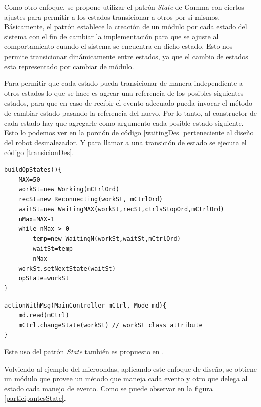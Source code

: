 Como otro enfoque, se propone utilizar el patrón \textit{State} de Gamma con ciertos ajustes para permitir a los estados transicionar a otros por si mismos. Básicamente, el patrón establece la creación de un módulo por cada estado del sistema con el fin de cambiar la implementación para que se ajuste al comportamiento cuando el sistema se encuentra en dicho estado. Esto nos permite transicionar dinámicamente entre estados, ya que el cambio de estados esta representado por cambiar de módulo.

Para permitir que cada estado pueda transicionar de manera independiente a otros estados lo que se hace es agrear una referencia de los posibles siguientes estados, para que en caso de recibir el evento adecuado pueda invocar el método de cambiar estado pasando la referencia del nuevo. Por lo tanto, al constructor de cada estado hay que agregarle como argumento cada posible estado siguiente. Esto lo podemos ver en la porción de código \ref{waitingDes} perteneciente al diseño del robot desmalezador. Y para llamar a una transición de estado se ejecuta el código \ref{transicionDes}.

\begin{lstlisting}[label={waitingDes},caption=Código ejemplo transición robot desmalezador,style=seudocode]
buildOpStates(){
    MAX=50
    workSt=new Working(mCtrlOrd)
    recSt=new Reconnecting(workSt, mCtrlOrd)
    waitSt=new WaitingMAX(workSt,recSt,ctrlsStopOrd,mCtrlOrd)
    nMax=MAX-1
    while nMax > 0
        temp=new WaitingN(workSt,waitSt,mCtrlOrd)
        waitSt=temp
        nMax--
    workSt.setNextState(waitSt)
    opState=workSt
}
\end{lstlisting}


\begin{lstlisting}[label={transicionDes}, caption=Ejemplo transición de estado.,style=seudocode]
actionWithMsg(MainController mCtrl, Mode md){
    md.read(mCtrl)
    mCtrl.changeState(workSt) // workSt class attribute
}
\end{lstlisting}

Este uso del patrón \textit{State} también es propuesto en \cite[\textit{Chapter 10 : Finite State Machine Patterns Part III: New Patterns as Design Components}]{douglass}.


Volviendo al ejemplo del microondas, aplicando este enfoque de diseño, se obtiene un módulo que provee un método que maneja cada evento y otro que delega al estado cada manejo de evento. Como se puede observar en la figura \ref{participantesState}.

